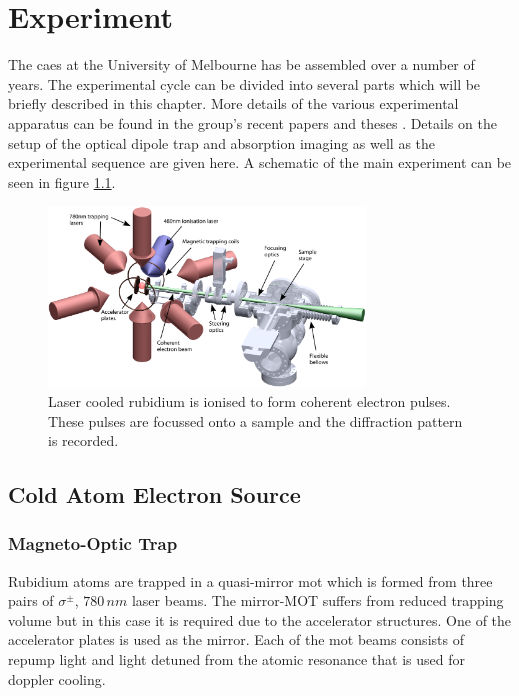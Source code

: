 \chapter{Experiment}

The \gls{caes} at the University of Melbourne has be assembled over a number of years. The experimental cycle can be divided into several parts which will be briefly described in this chapter. More details of the various experimental apparatus can be found in the group's recent papers \cite{bell_slow_2010, mcculloch_arbitrarily_2011, saliba_spatial_2012} and theses \cite{mcculloch_towards_2012, sheludko_shaped_2010, saliba_partially_2011}. Details on the setup of the optical dipole trap and absorption imaging as well as the experimental sequence are given here. A schematic of the main experiment can be seen in figure \ref{fig:experiment}.

\begin{figure}[h]
\centering
\includegraphics[width=0.75\textwidth]{figs/MOT_and_sample.pdf}
\caption{Laser cooled rubidium is ionised to form coherent electron pulses. These pulses are focussed onto a sample and the diffraction pattern is recorded.}
\label{fig:experiment}
\end{figure}

\section{Cold Atom Electron Source}
\subsection{Magneto-Optic Trap}
Rubidium atoms are trapped in a quasi-mirror \gls{mot} which is formed from three pairs of $\sigma^\pm$, $780\,\unit{nm}$ laser beams. The mirror-MOT suffers from reduced trapping volume\cite{reichel_atomic_1999} but in this case it is required due to the accelerator structures. One of the accelerator plates is used as the mirror. Each of the \gls{mot} beams consists of repump light and light detuned from the atomic resonance that is used for doppler cooling.

